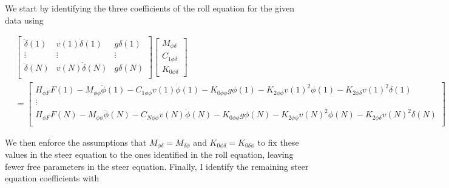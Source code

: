 \documentclass[a4paper]{article}
\begin{document}
We start by identifying the three coefficients of the roll equation for
the given data using

\begin{align}
  &\begin{bmatrix}
     \ddot{\delta}(1) &
     v(1) \dot{\delta}(1) &
     g \delta(1) \\
     \vdots & \vdots & \vdots\\
     \ddot{\delta}(N) &
     v(N) \dot{\delta}(N) &
     g \delta(N) \\
  \end{bmatrix}
  \begin{bmatrix}
    M_{\phi\delta} \\
    C_{1\phi\delta} \\
    K_{0\phi\delta}
  \end{bmatrix}\\
  &=
  \begin{bmatrix}
    H_{\phi F} F(1)
    - M_{\phi\phi} \ddot{\phi}(1)
    - C_{1\phi\phi} v(1) \dot{\phi}(1)
    - K_{0\phi\phi} g \phi(1)
    - K_{2\phi\phi} v(1)^2 \phi(1)
    - K_{2\phi\delta} v(1)^2 \delta(1) \\
  \vdots\\
    H_{\phi F} F(N)
    - M_{\phi\phi} \ddot{\phi}(N)
    - C_{N\phi\phi} v(N) \dot{\phi}(N)
    - K_{0\phi\phi} g \phi(N)
    - K_{2\phi\phi} v(N)^2 \phi(N)
    - K_{2\phi\delta} v(N)^2 \delta(N) \\
  \end{bmatrix} \nonumber
\end{align}

We then enforce the assumptions that $M_{\phi\delta} = M_{\delta\phi}$ and
$K_{0\phi\delta} = K_{0\delta\phi}$ to fix these values in the steer equation
to the ones identified in the roll equation, leaving fewer free parameters in
the steer equation. Finally, I identify the remaining steer equation
coefficients with
\end{document}
